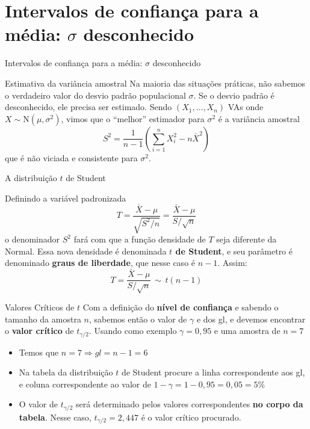 \documentclass[14pt,aspectratio=1610]{beamer}
\begin{document}
	\section{Intervalos de confiança para a média: $\sigma$ desconhecido}
	\begin{frame}{Intervalos de confiança para a média: $\sigma$ desconhecido}
		\begin{block}{Estimativa da variância amostral}
			\justifying
			Na maioria das situações práticas, não sabemos o verdadeiro valor do desvio padrão populacional $\sigma$. Se o desvio padrão é desconhecido, ele precisa ser estimado. Sendo $(X_1, \ldots, X_n)$ VAs onde $X \sim \text{N}(\mu, \sigma^2)$, vimos que o ``melhor'' estimador para $\sigma^2$ é a variância amostral
			$$
			S^2 = \frac{1}{n-1} (\sum_{i=1}^{n} X_i^2 - n\bar{X}^2)
			$$   
			que é não viciada e consistente para $\sigma^2$.   
		\end{block}
	\end{frame}
	
	\begin{frame}{A distribuição $t$ de Student}
		\begin{block}{}
			\justifying
			Definindo a variável padronizada
			$$
			T = \frac{\bar{X} - \mu}{\sqrt{S^2/n}} = \frac{\bar{X} - \mu}{S/\sqrt{n}}
			$$   
			o denominador $S^2$ fará com que a função densidade de $T$ seja diferente da Normal. Essa nova densidade é denominada \textbf{$t$ de Student}, e seu parâmetro é
			denominado \textbf{graus de liberdade}, que nesse caso é $n-1$. Assim:
			$$
			T = \frac{\bar{X} - \mu}{S/\sqrt{n}} \, \sim \, t(n-1)
			$$   
		\end{block}
	\end{frame}
	
	\begin{frame}{}
		\begin{block}{Valores Críticos de $t$}
			\justifying
			Com a definição do \textbf{nível de confiança} e sabendo o tamanho da amostra $n$, sabemos então o valor de $\gamma$ e dos gl, e devemos encontrar o \textbf{valor crítico} de $t_{\gamma/2}$. Usando como exemplo $\gamma = 0,95$ e uma amostra de $n=7$
			
			\begin{itemize}
				\item Temos que $n=7 \Rightarrow gl = n-1 = 6$
				
				\item Na tabela da distribuição $t$ de Student procure a linha correspondente aos gl, e  coluna correspondente ao valor de $1 - \gamma = 1 - 0,95 = 0,05 = 5\%$
				
				\item O valor de $t_{\gamma/2}$ será determinado pelos valores correspondentes \textbf{no corpo da tabela}. Nesse caso, $t_{\gamma/2} = 2,447$ é o valor crítico procurado.
			\end{itemize}   
		\end{block}
	\end{frame}
	
\end{document}
